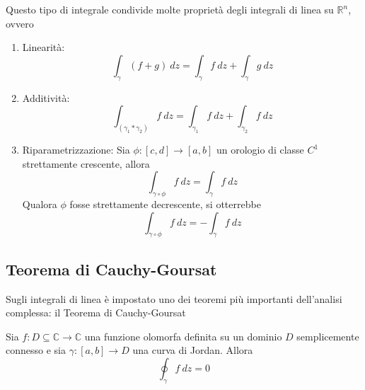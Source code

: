             Questo tipo di integrale condivide molte proprietà degli integrali di linea su $\mathbb{R}^{n}$, ovvero
            \begin{enumerate}
                \item Linearità:
                \[
                    \int_{\gamma} (f + g) \: dz = \int_{\gamma} f \: dz + \int_{\gamma} g \: dz
                \]

                \item Additività:
                \[
                    \int_{(\gamma_{1} * \gamma_{2})} f \: dz = \int_{\gamma_{1}} f \: dz + \int_{\gamma_{2}} f \: dz
                \]

                \item Riparametrizzazione: Sia $\phi: [c, d] \rightarrow [a, b]$ un orologio di classe $C^{1}$ strettamente crescente, allora
                \[
                    \int_{\gamma \circ \phi} f \: dz = \int_{\gamma} f \: dz
                \]
                Qualora $\phi$ fosse strettamente decrescente, si otterrebbe
                \[
                    \int_{\gamma \circ \phi} f \: dz = - \int_{\gamma} f \: dz
                \]
            \end{enumerate}

    \subsection{Teorema di Cauchy-Goursat}
            Sugli integrali di linea è impostato uno dei teoremi più importanti dell'analisi complessa: il Teorema di Cauchy-Goursat

            \begin{theorem}
                Sia $f: D \subseteq \mathbb{C} \rightarrow \mathbb{C}$ una funzione olomorfa definita su un dominio $D$ semplicemente connesso e sia $\gamma: [a, b] \rightarrow D$ una curva di Jordan.
                Allora
                \[
                    \oint_{\gamma} f \: dz = 0
                \]
            \end{theorem}

